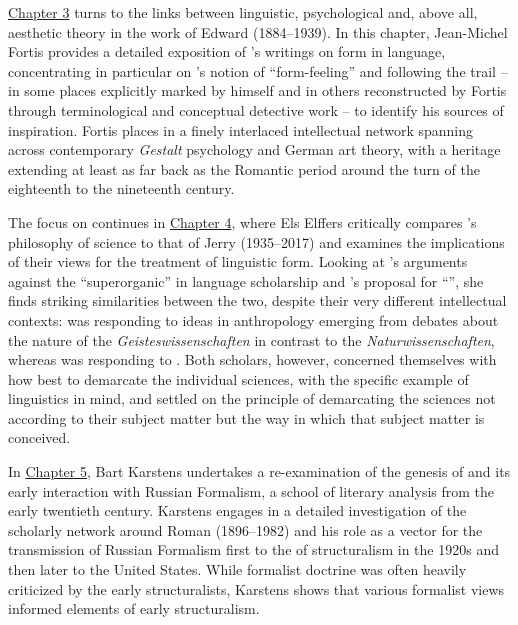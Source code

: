 \documentclass[output=paper]{langscibook}
\begin{document}
\hyperref[chap:fortis]{Chapter 3} turns to the links between linguistic, psychological and, above all, aesthetic theory in the work of Edward {\Sapir} (1884--1939). In this chapter, Jean-Michel Fortis provides a detailed exposition of {\Sapir}'s writings on form in language, concentrating in particular on {\Sapir}'s notion of ``form-feeling'' and following the trail -- in some places explicitly marked by {\Sapir} himself and in others reconstructed by Fortis through terminological and conceptual detective work -- to identify his sources of inspiration. Fortis places {\Sapir} in a finely interlaced intellectual network spanning across contemporary \emph{Gestalt} psychology and German art theory, with a heritage extending at least as far back as the Romantic period around the turn of the eighteenth to the nineteenth century.

The focus on {\Sapir} continues in \hyperref[chap:elffers]{Chapter 4}, where Els Elffers critically compares {\Sapir}'s philosophy of science to that of Jerry {\Fodor} (1935--2017) and examines the implications of their views for the treatment of linguistic form. Looking at {\Sapir}'s arguments against the ``superorganic'' in language scholarship and {\Fodor}'s proposal for ``'', she finds striking similarities between the two, despite their very different intellectual contexts: {\Sapir} was responding to ideas in anthropology emerging from debates about the nature of the \emph{Geisteswissenschaften} in contrast to the \emph{Naturwissenschaften}, whereas {\Fodor} was responding to . Both scholars, however, concerned themselves with how best to demarcate the individual sciences, with the specific example of linguistics in mind, and settled on the principle of demarcating the sciences not according to their subject matter but the way in which that subject matter is conceived.

In \hyperref[chap:karstens]{Chapter 5}, Bart Karstens undertakes a re-examination of the genesis of  and its early interaction with Russian Formalism, a school of literary analysis from the early twentieth century. Karstens engages in a detailed investigation of the scholarly network around Roman {\Jakobson} (1896--1982) and his role as a vector for the transmission of Russian Formalism first to the {\PragueSchool} of structuralism in the 1920s and then later to the United States. While formalist doctrine was often heavily criticized by the early structuralists, Karstens shows that various formalist views informed elements of early structuralism.
\end{document}
